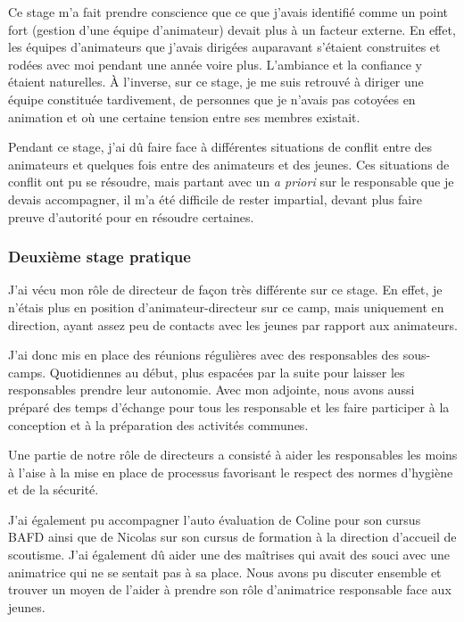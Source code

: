 \documentclass[titlepage,11pt,a4paper]{article}
\begin{document}
Ce stage m'a fait prendre conscience que ce que j'avais identifié comme un point fort
(gestion d'une équipe d'animateur) devait plus à un facteur externe. En effet, les équipes
d'animateurs que j'avais dirigées auparavant s'étaient construites et rodées avec moi pendant
une année voire plus. L'ambiance et la confiance y étaient naturelles. À l'inverse, sur ce
stage, je me suis retrouvé à diriger une équipe constituée tardivement, de personnes que
je n'avais pas cotoyées en animation et où une certaine tension entre ses membres
existait.

Pendant ce stage, j'ai dû faire face à différentes situations de conflit entre des
animateurs et quelques fois entre des animateurs et des jeunes. Ces situations de conflit
ont pu se résoudre, mais partant avec un \textit{a priori} sur le responsable que je
devais accompagner, il m'a été difficile de rester impartial, devant plus faire preuve
d'autorité pour en résoudre certaines.

\subsubsection{Deuxième stage pratique}

J'ai vécu mon rôle de directeur de façon très différente sur ce stage. En effet,
je n'étais plus en position d'animateur-directeur sur ce camp, mais uniquement en
direction, ayant assez peu de contacts avec les jeunes par rapport aux animateurs.

J'ai donc mis en place des réunions régulières avec des responsables des sous-camps.
Quotidiennes au début, plus espacées par la suite pour laisser les responsables prendre leur autonomie.
Avec mon adjointe, nous avons aussi préparé des temps d'échange pour tous les responsable et les faire
participer à la conception et à la préparation des activités communes.

Une partie de notre rôle de directeurs a consisté à aider les responsables les moins à l'aise à
la mise en place de processus favorisant le respect des normes d'hygiène et de la sécurité.

J'ai également pu accompagner l'auto évaluation de Coline pour son cursus BAFD ainsi que
de Nicolas sur son cursus de formation à la direction d'accueil de scoutisme. J'ai
également dû aider une des maîtrises qui avait des souci avec une animatrice qui ne se
sentait pas à sa place. Nous avons pu discuter ensemble et trouver un moyen de l'aider à
prendre son rôle d'animatrice responsable face aux jeunes.
\end{document}
